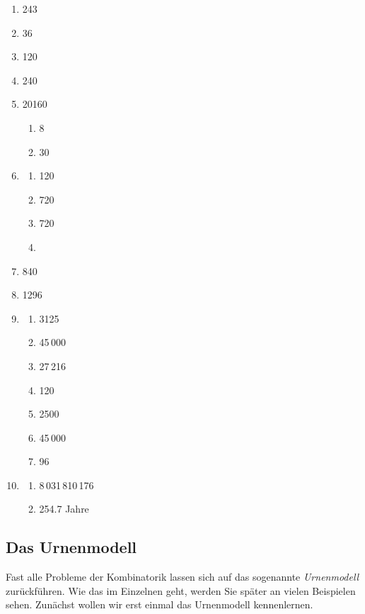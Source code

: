 \begin{enumerate}
    \item 243
    \item 36
    \item 120
    \item 240
    \item 20160
          \begin{enumerate}
              \item 8
              \item 30
          \end{enumerate}
    \item
          \begin{enumerate}
              \item 120
              \item 720
              \item 720
              \item
          \end{enumerate}
    \item 840
    \item 1296
    \item
          \begin{enumerate}
              \item 3125
              \item 45\,000
              \item 27\,216
              \item 120
              \item 2500
              \item 45\,000
              \item 96
          \end{enumerate}
    \item
          \begin{enumerate}
              \item 8\,031\,810\,176
              \item 254.7 Jahre
          \end{enumerate}
\end{enumerate}

\clearpage
\subsection{Das Urnenmodell}

Fast alle Probleme der Kombinatorik lassen sich auf das sogenannte \emph{Urnenmodell} zurückführen. Wie das im Einzelnen geht, werden Sie später an vielen Beispielen sehen. Zunächst wollen wir erst einmal das Urnenmodell kennenlernen.

